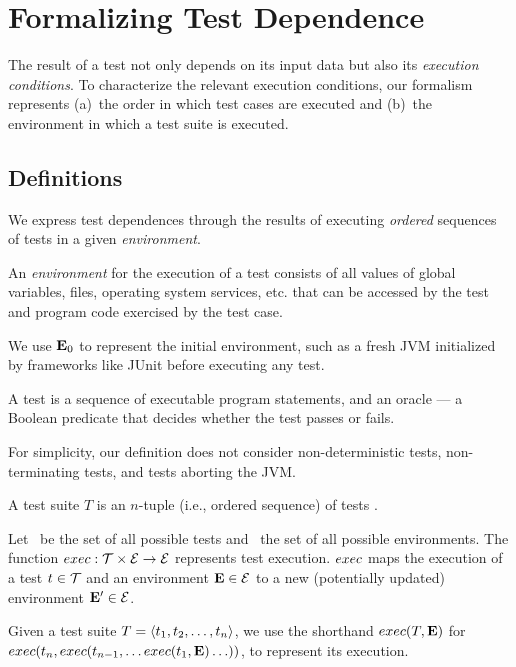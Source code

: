 
\section{Formalizing Test Dependence}
\label{sec:formalism}


The result of a test not only depends on
its input data but also its \emph{execution conditions}.
To characterize the relevant execution conditions, 
our formalism represents
(a)~the order in which test cases are executed and (b)~the environment in which a test suite is executed.  


\subsection{Definitions}
\label{sec:definitions}

We express test dependences through the results of executing
\emph{ordered} sequences of tests in a given \emph{environment}.


\begin{definition}[Environment]
An \emph{environment} \env for the execution of a test
consists of all values of global variables, files,
operating
system services, etc. that
can be accessed by the test and program code exercised by the test
case.
\end{definition}

We use $\mathbf{E}_0$ to represent the initial environment, such
as a fresh JVM initialized by frameworks like JUnit
before executing any test.


\begin{definition}[Test]

A test is a sequence of executable program statements, and an oracle
--- a Boolean predicate that
decides whether the test passes or fails.
\end{definition}

For simplicity, our definition does not consider non-deter\-min\-istic
tests, non-terminating tests, and tests aborting the JVM.


\begin{definition}
A test suite\/ $T$ is an $n$-tuple (i.e., ordered sequence) of tests
.

\end{definition}


\begin{definition}
Let\/ \alltests\ be the set of all possible
tests and\/ \environs\ the set of all possible
environments.
The function\/ $exec: \mathcal{T} \times \mathcal{E} \rightarrow
\mathcal{E}$ represents test
execution. $exec$ maps the execution of a test\/ $ t \in
\mathcal{T}$ 
and an environment\/ $\mathbf{E} \in \mathcal{E}$ to a new (potentially updated)
environment\/ $\mathbf{E}' \in \mathcal{E}$.

Given a test suite\/ $T =  \langle t_1, t_2, \dots, t_n \rangle $,
we use the shorthand\/
$exec(T,\mathbf{E})$ for $exec(t_n,exec(t_{n-1},{\dots exec(t_1,\mathbf{E}) \dots }))$, to represent its execution.
\end{definition}

